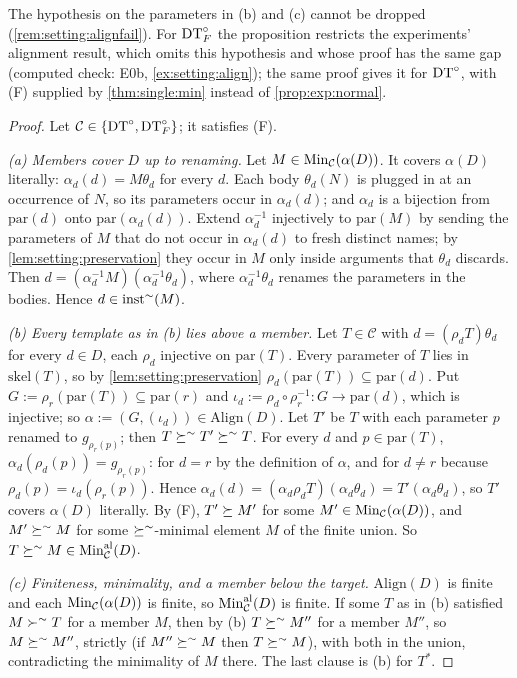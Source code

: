 The hypothesis on the parameters in (b) and (c) cannot be dropped (\cref{rem:setting:alignfail}). For $\mathrm{DT}^{\circ}_{F}$ the proposition restricts the experiments' alignment result, which omits this hypothesis and whose proof has the same gap (computed check: E0b, \cref{ex:setting:align}); the same proof gives it for $\mathrm{DT}^{\circ}$, with (F) supplied by \cref{thm:single:min} instead of \cref{prop:exp:normal}.

\begin{proof}
Let $\mathcal C\in\{\mathrm{DT}^{\circ},\mathrm{DT}^{\circ}_{F}\}$; it satisfies (F).

\emph{(a) Members cover $D$ up to renaming.} Let $M\in\mathrm{Min}_{\mathcal C}(\alpha(D))$. It covers $\alpha(D)$ literally: $\alpha_d(d)=M\theta_d$ for every $d$. Each body $\theta_d(N)$ is plugged in at an occurrence of $N$, so its parameters occur in $\alpha_d(d)$; and $\alpha_d$ is a bijection from $\mathrm{par}(d)$ onto $\mathrm{par}(\alpha_d(d))$. Extend $\alpha_d^{-1}$ injectively to $\mathrm{par}(M)$ by sending the parameters of $M$ that do not occur in $\alpha_d(d)$ to fresh distinct names; by \cref{lem:setting:preservation} they occur in $M$ only inside arguments that $\theta_d$ discards. Then $d=(\alpha_d^{-1}M)(\alpha_d^{-1}\theta_d)$, where $\alpha_d^{-1}\theta_d$ renames the parameters in the bodies. Hence $d\in\mathrm{inst}^{\sim}(M)$.

\emph{(b) Every template as in (b) lies above a member.} Let $T\in\mathcal C$ with $d=(\rho_dT)\theta_d$ for every $d\in D$, each $\rho_d$ injective on $\mathrm{par}(T)$. Every parameter of $T$ lies in $\mathrm{skel}(T)$, so by \cref{lem:setting:preservation} $\rho_d(\mathrm{par}(T))\subseteq\mathrm{par}(d)$. Put $G:=\rho_r(\mathrm{par}(T))\subseteq\mathrm{par}(r)$ and $\iota_d:=\rho_d\circ\rho_r^{-1}:G\to\mathrm{par}(d)$, which is injective; so $\alpha:=(G,(\iota_d))\in\mathrm{Align}(D)$. Let $T'$ be $T$ with each parameter $p$ renamed to $g_{\rho_r(p)}$; then $T\succeq^{\sim}T'\succeq^{\sim}T$. For every $d$ and $p\in\mathrm{par}(T)$, $\alpha_d(\rho_d(p))=g_{\rho_r(p)}$: for $d=r$ by the definition of $\alpha$, and for $d\neq r$ because $\rho_d(p)=\iota_d(\rho_r(p))$. Hence $\alpha_d(d)=(\alpha_d\rho_dT)(\alpha_d\theta_d)=T'(\alpha_d\theta_d)$, so $T'$ covers $\alpha(D)$ literally. By (F), $T'\succeq M'$ for some $M'\in\mathrm{Min}_{\mathcal C}(\alpha(D))$, and $M'\succeq^{\sim}M$ for some $\succeq^{\sim}$-minimal element $M$ of the finite union. So $T\succeq^{\sim}M\in\mathrm{Min}^{\mathrm{al}}_{\mathcal C}(D)$.

\emph{(c) Finiteness, minimality, and a member below the target.} $\mathrm{Align}(D)$ is finite and each $\mathrm{Min}_{\mathcal C}(\alpha(D))$ is finite, so $\mathrm{Min}^{\mathrm{al}}_{\mathcal C}(D)$ is finite. If some $T$ as in (b) satisfied $M\succ^{\sim}T$ for a member $M$, then by (b) $T\succeq^{\sim}M''$ for a member $M''$, so $M\succeq^{\sim}M''$, strictly (if $M''\succeq^{\sim}M$ then $T\succeq^{\sim}M$), with both in the union, contradicting the minimality of $M$ there. The last clause is (b) for $T^*$.
\end{proof}

